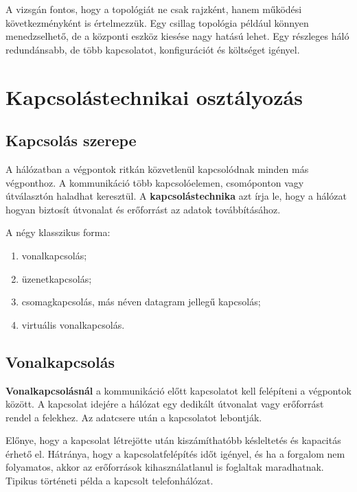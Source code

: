 \begin{center}

\end{center}

A vizsgán fontos, hogy a topológiát ne csak rajzként, hanem működési következményként is értelmezzük. Egy csillag topológia például könnyen menedzselhető, de a központi eszköz kiesése nagy hatású lehet. Egy részleges háló redundánsabb, de több kapcsolatot, konfigurációt és költséget igényel.

\section{Kapcsolástechnikai osztályozás}

\subsection{Kapcsolás szerepe}

A hálózatban a végpontok ritkán közvetlenül kapcsolódnak minden más végponthoz. A kommunikáció több kapcsolóelemen, csomóponton vagy útválasztón haladhat keresztül. A \textbf{kapcsolástechnika} azt írja le, hogy a hálózat hogyan biztosít útvonalat és erőforrást az adatok továbbításához.

A négy klasszikus forma:

\begin{enumerate}
  \item vonalkapcsolás;
  \item üzenetkapcsolás;
  \item csomagkapcsolás, más néven datagram jellegű kapcsolás;
  \item virtuális vonalkapcsolás.
\end{enumerate}

\subsection{Vonalkapcsolás}

\textbf{Vonalkapcsolásnál} a kommunikáció előtt kapcsolatot kell felépíteni a végpontok között. A kapcsolat idejére a hálózat egy dedikált útvonalat vagy erőforrást rendel a felekhez. Az adatcsere után a kapcsolatot lebontják.

Előnye, hogy a kapcsolat létrejötte után kiszámíthatóbb késleltetés és kapacitás érhető el. Hátránya, hogy a kapcsolatfelépítés időt igényel, és ha a forgalom nem folyamatos, akkor az erőforrások kihasználatlanul is foglaltak maradhatnak. Tipikus történeti példa a kapcsolt telefonhálózat.


